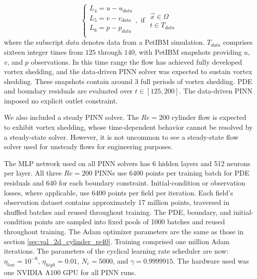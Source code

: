 \begin{equation}\label{eq:data-driven-loss}
    \left\{
        \begin{array}{l}
            L_4 = u - u_{data}\\
            L_5 = v - v_{data}\\
            L_6 = p - p_{data}\\
        \end{array}
    \right.
    ,\text{ if }
    \begin{array}{l}
        \vec{x} \in \Omega \\
        t \in T_{data}
    \end{array}
\end{equation}
where the subscript $data$ denotes data from a PetIBM simulation.
$T_{data}$ comprises sixteen integer times from $125$ through $140$, with PetIBM snapshots providing $u$, $v$, and $p$ observations.
In this time range the flow has achieved fully developed vortex shedding, and the data-driven PINN solver was expected to sustain vortex shedding.
These snapshots contain around $3$ full periods of vortex shedding.
PDE and boundary residuals are evaluated over $t\in[125,200]$.
The data-driven PINN imposed no explicit outlet constraint.

We also included a steady PINN solver.
The $Re=200$ cylinder flow is expected to exhibit vortex shedding, whose time-dependent behavior cannot be resolved by a steady-state solver.
However, it is not uncommon to see a steady-state flow solver used for unsteady flows for engineering purposes.

The MLP network used on all PINN solvers has 6 hidden layers and 512 neurons per layer.
All three $Re=200$ PINNs use \num{6400} points per training batch for PDE residuals and \num{640} for each boundary constraint.
Initial-condition or observation losses, where applicable, use \num{6400} points per field per iteration.
Each field's observation dataset contains approximately 17 million points, traversed in shuffled batches and reused throughout training.
The PDE, boundary, and initial-condition points are sampled into fixed pools of \num{1000} batches and reused throughout training.
The Adam optimizer parameters are the same as those in section \ref{sec:val_2d_cylinder_re40}.
Training comprised one million Adam iterations.
The parameters of the cyclical learning rate scheduler are now: $\eta_{low}=10^{-6}$, $\eta_{high}=0.01$, $N_c=5000$, and $\gamma=0.9999915$.
The hardware used was one NVIDIA A100 GPU for all PINN runs.


